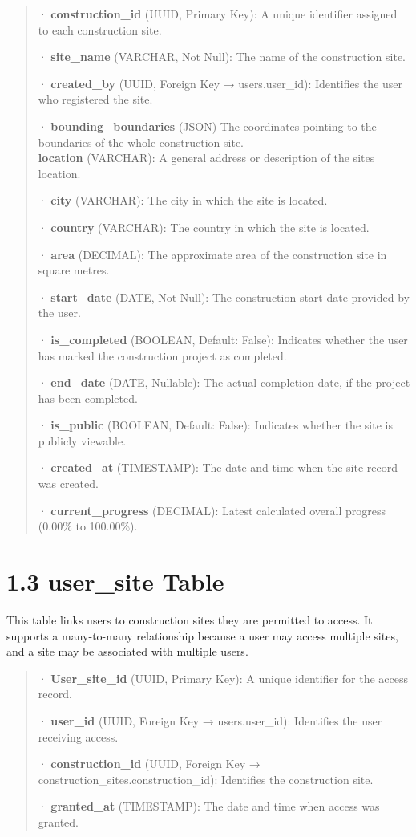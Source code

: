 \documentclass[12pt,a4paper]{report}
\begin{document}
\begin{quote}
· \textbf{construction\_id} (UUID, Primary Key): A unique identifier
assigned to each construction site.

· \textbf{site\_name} (VARCHAR, Not Null): The name of the construction
site.

· \textbf{created\_by} (UUID, Foreign Key → users.user\_id): Identifies
the user who registered the site.

· \textbf{bounding\_boundaries} (JSON) The coordinates pointing to the
boundaries of the whole construction site.\\
\textbf{location} (VARCHAR): A general address or description of the
site\textquotesingle s location.

· \textbf{city} (VARCHAR): The city in which the site is located.

· \textbf{country} (VARCHAR): The country in which the site is located.

· \textbf{area} (DECIMAL): The approximate area of the construction site
in square metres.

· \textbf{start\_date} (DATE, Not Null): The construction start date
provided by the user.

· \textbf{is\_completed} (BOOLEAN, Default: False): Indicates whether
the user has marked the construction project as completed.

· \textbf{end\_date} (DATE, Nullable): The actual completion date, if
the project has been completed.

· \textbf{is\_public} (BOOLEAN, Default: False): Indicates whether the
site is publicly viewable.

· \textbf{created\_at} (TIMESTAMP): The date and time when the site
record was created.

· \textbf{current\_progress} (DECIMAL): Latest calculated overall
progress (0.00\% to 100.00\%).
\end{quote}

\section{1.3 user\_site Table}\label{user_site-table}

This table links users to construction sites they are permitted to
access. It supports a many-to-many relationship because a user may
access multiple sites, and a site may be associated with multiple users.

\begin{quote}
· \textbf{User\_site\_id} (UUID, Primary Key): A unique identifier for
the access record.

· \textbf{user\_id} (UUID, Foreign Key → users.user\_id): Identifies the
user receiving access.

· \textbf{construction\_id} (UUID, Foreign Key →
construction\_sites.construction\_id): Identifies the construction site.

· \textbf{granted\_at} (TIMESTAMP): The date and time when access was
granted.
\end{quote}
\end{document}

